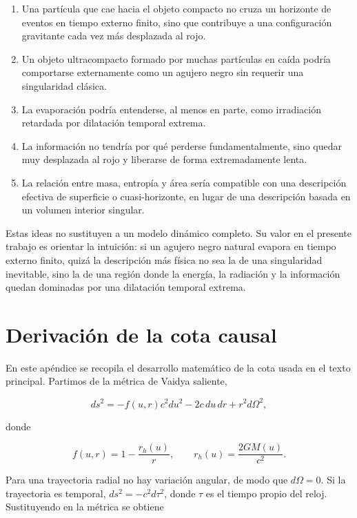 \documentclass[
aps,
prd,
reprint,
superscriptaddress,
nofootinbib,
amsmath,
amssymb
]{revtex4-2}
\begin{document}
\begin{enumerate}
\item Una partícula que cae hacia el objeto compacto no cruza un horizonte de eventos en tiempo externo finito, sino que contribuye a una configuración gravitante cada vez más desplazada al rojo.
\item Un objeto ultracompacto formado por muchas partículas en caída podría comportarse externamente como un agujero negro sin requerir una singularidad clásica.
\item La evaporación podría entenderse, al menos en parte, como irradiación retardada por dilatación temporal extrema.
\item La información no tendría por qué perderse fundamentalmente, sino quedar muy desplazada al rojo y liberarse de forma extremadamente lenta.
\item La relación entre masa, entropía y área sería compatible con una descripción efectiva de superficie o cuasi-horizonte, en lugar de una descripción basada en un volumen interior singular.
\end{enumerate}

Estas ideas no sustituyen a un modelo dinámico completo. Su valor en el presente trabajo es orientar la intuición: si un agujero negro natural evapora en tiempo externo finito, quizá la descripción más física no sea la de una singularidad inevitable, sino la de una región donde la energía, la radiación y la información quedan dominadas por una dilatación temporal extrema.

\appendix

\section{Derivación de la cota causal}

En este apéndice se recopila el desarrollo matemático de la cota usada en el texto principal. Partimos de la métrica de Vaidya saliente,

\begin{equation}
ds^2 =
-
f(u,r)c^2du^2
-2c\,du\,dr
+r^2d\Omega^2,
\end{equation}

donde

\begin{equation}
f(u,r)=
1-\frac{r_h(u)}{r},
\qquad
r_h(u)=
\frac{2GM(u)}{c^2}.
\end{equation}

Para una trayectoria radial no hay variación angular, de modo que $d\Omega=0$. Si la trayectoria es temporal, $ds^2=-c^2d\tau^2$, donde $\tau$ es el tiempo propio del reloj. Sustituyendo en la métrica se obtiene
\end{document}
